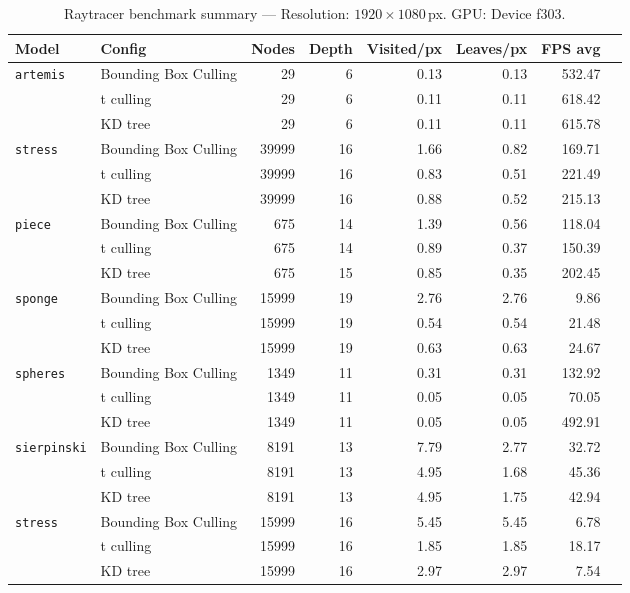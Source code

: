 
\begin{table}[htbp]
  \centering\small
  \setlength{\tabcolsep}{4pt}
  \caption{Raytracer benchmark summary --- Resolution: $1920\times1080$\,px. GPU: Device f303.}
  \label{tab:rt-summary}
  \begin{tabular}{@{}llrrrrrr@{}}
    \toprule
    \textbf{Model} & \textbf{Config} & \textbf{Nodes} & \textbf{Depth} & \textbf{Visited/px} & \textbf{Leaves/px} & \textbf{FPS avg} \\
    \midrule
    \multirow{3}{*}{\texttt{artemis}} & Bounding Box Culling & 29 & 6 & 0.13 & 0.13 & 532.47 \\
     & t culling & 29 & 6 & 0.11 & 0.11 & 618.42 \\
     & KD tree & 29 & 6 & 0.11 & 0.11 & 615.78 \\
    \midrule
    \multirow{3}{*}{\texttt{stress}} & Bounding Box Culling & 39999 & 16 & 1.66 & 0.82 & 169.71 \\
     & t culling & 39999 & 16 & 0.83 & 0.51 & 221.49 \\
     & KD tree & 39999 & 16 & 0.88 & 0.52 & 215.13 \\
    \midrule
    \multirow{3}{*}{\texttt{piece}} & Bounding Box Culling & 675 & 14 & 1.39 & 0.56 & 118.04 \\
     & t culling & 675 & 14 & 0.89 & 0.37 & 150.39 \\
     & KD tree & 675 & 15 & 0.85 & 0.35 & 202.45 \\
    \midrule
    \multirow{3}{*}{\texttt{sponge}} & Bounding Box Culling & 15999 & 19 & 2.76 & 2.76 & 9.86 \\
     & t culling & 15999 & 19 & 0.54 & 0.54 & 21.48 \\
     & KD tree & 15999 & 19 & 0.63 & 0.63 & 24.67 \\
    \midrule
    \multirow{3}{*}{\texttt{spheres}} & Bounding Box Culling & 1349 & 11 & 0.31 & 0.31 & 132.92 \\
     & t culling & 1349 & 11 & 0.05 & 0.05 & 70.05 \\
     & KD tree & 1349 & 11 & 0.05 & 0.05 & 492.91 \\
    \midrule
    \multirow{3}{*}{\texttt{sierpinski}} & Bounding Box Culling & 8191 & 13 & 7.79 & 2.77 & 32.72 \\
     & t culling & 8191 & 13 & 4.95 & 1.68 & 45.36 \\
     & KD tree & 8191 & 13 & 4.95 & 1.75 & 42.94 \\
    \midrule
    \multirow{3}{*}{\texttt{stress}} & Bounding Box Culling & 15999 & 16 & 5.45 & 5.45 & 6.78 \\
     & t culling & 15999 & 16 & 1.85 & 1.85 & 18.17 \\
     & KD tree & 15999 & 16 & 2.97 & 2.97 & 7.54 \\
    \bottomrule
  \end{tabular}
\end{table}
